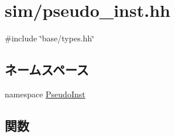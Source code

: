 \hypertarget{pseudo__inst_8hh}{
\section{sim/pseudo\_\-inst.hh}
\label{pseudo__inst_8hh}
}
{\ttfamily \#include \char`\"{}base/types.hh\char`\"{}}\par
\subsection*{ネームスペース}
\begin{DoxyCompactItemize}
\item 
namespace \hyperlink{namespacePseudoInst}{PseudoInst}
\end{DoxyCompactItemize}
\subsection*{関数}

